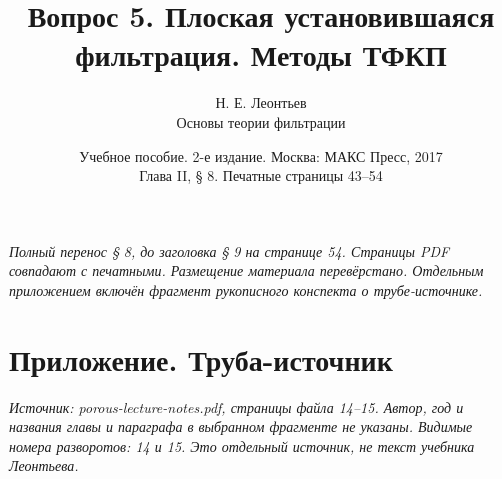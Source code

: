 \documentclass[12pt,a4paper]{article}
\title{Вопрос 5. Плоская установившаяся фильтрация. Методы ТФКП}
\author{Н. Е. Леонтьев\\\large Основы теории фильтрации}
\date{Учебное пособие. 2-е издание. Москва: МАКС Пресс, 2017\\Глава II, § 8. Печатные страницы 43--54}
\begin{document}
\maketitle
\noindent\textit{Полный перенос § 8, до заголовка § 9 на странице 54. Страницы PDF совпадают с печатными. Размещение материала перевёрстано. Отдельным приложением включён фрагмент рукописного конспекта о трубе-источнике.}

\clearpage
\section*{Приложение. Труба-источник}
\noindent\textit{Источник: porous-lecture-notes.pdf, страницы файла 14--15. Автор, год и названия главы и параграфа в выбранном фрагменте не указаны. Видимые номера разворотов: 14 и 15. Это отдельный источник, не текст учебника Леонтьева.}
\par\medskip

\end{document}
